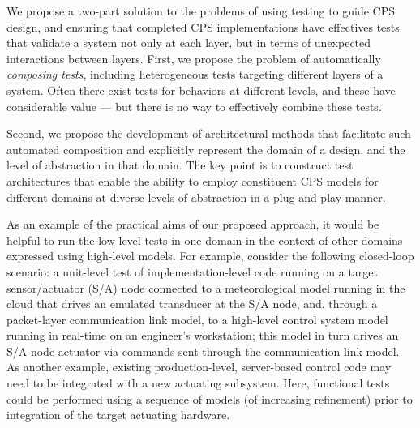 We propose a two-part solution to the problems of using testing to guide CPS design, and ensuring that completed CPS implementations have effectives tests that validate a system not only at each layer, but in terms of unexpected interactions between layers.  First, we propose the problem of automatically \emph{composing tests}, including heterogeneous tests targeting different layers of a system.  Often there exist tests for behaviors at different levels, and these have considerable value --- but there is no way to effectively combine these tests.

Second, we propose the development of architectural methods that facilitate such automated composition and explicitly represent the domain of a design, and the level of abstraction in that domain.  The key point is to construct test architectures  that enable the ability to employ constituent CPS models for different domains at diverse levels of abstraction in a plug-and-play manner.

As an example of the practical aims of our proposed approach, it would be helpful to run the low-level tests in one domain in the context of other domains expressed using high-level models. For example, consider the following closed-loop scenario: a unit-level test of implementation-level code running on a target sensor/actuator (S/A) node connected to a meteorological model running in the cloud that drives an emulated transducer at the S/A node, and, through a packet-layer communication link model, to a high-level control system model running in real-time on an engineer's workstation; this model in turn drives an S/A node actuator via commands sent through the communication link model. As another example, existing production-level, server-based control code may need to be integrated with a new actuating subsystem. Here, functional tests could be performed using a sequence of models (of increasing refinement) prior to integration of the target actuating hardware.